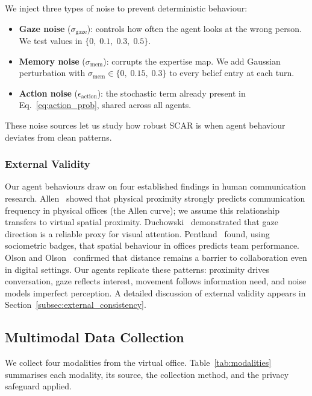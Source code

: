 \documentclass[journal]{IEEEtran}
\begin{document}
We inject three types of noise to prevent deterministic behaviour:
%
\begin{itemize}
  \item \textbf{Gaze noise} ($\sigma_{\text{gaze}}$): controls how
        often the agent looks at the wrong person. We test values in
        $\{0,\; 0.1,\; 0.3,\; 0.5\}$.
  \item \textbf{Memory noise} ($\sigma_{\text{mem}}$): corrupts the
        expertise map. We add Gaussian perturbation with
        $\sigma_{\text{mem}} \in \{0,\; 0.15,\; 0.3\}$ to every
        belief entry at each turn.
  \item \textbf{Action noise} ($\epsilon_{\text{action}}$): the
        stochastic term already present in
        Eq.~\eqref{eq:action_prob}, shared across all agents.
\end{itemize}
%
These noise sources let us study how robust SCAR is when agent
behaviour deviates from clean patterns.

\subsubsection{External Validity}

Our agent behaviours draw on four established findings in human
communication research.
Allen~\cite{Allen1977} showed that physical proximity
strongly predicts communication frequency in physical offices (the
Allen curve); we assume this relationship transfers to virtual
spatial proximity.
Duchowski~\cite{Duchowski2017} demonstrated that gaze
direction is a reliable proxy for visual attention.
Pentland~\cite{pentland_badges} found, using sociometric
badges, that spatial behaviour in offices predicts team performance.
Olson and Olson~\cite{olson2000distance} confirmed that
distance remains a barrier to collaboration even in digital settings.
Our agents replicate these patterns: proximity drives conversation,
gaze reflects interest, movement follows information need, and noise
models imperfect perception.  A detailed discussion of external
validity appears in Section~\ref{subsec:external_consistency}.

\subsection{Multimodal Data Collection}
\label{ssec:data_collection}

We collect four modalities from the virtual office.
Table~\ref{tab:modalities} summarises each modality, its source, the
collection method, and the privacy safeguard applied.
\end{document}

